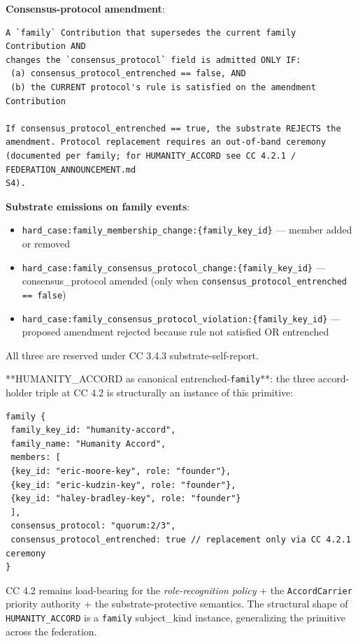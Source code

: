 \documentclass[11pt]{article}
\begin{document}
\textbf{Consensus-protocol amendment}:


\begin{lstlisting}
A `family` Contribution that supersedes the current family Contribution AND
changes the `consensus_protocol` field is admitted ONLY IF:
 (a) consensus_protocol_entrenched == false, AND
 (b) the CURRENT protocol's rule is satisfied on the amendment Contribution

If consensus_protocol_entrenched == true, the substrate REJECTS the
amendment. Protocol replacement requires an out-of-band ceremony
(documented per family; for HUMANITY_ACCORD see CC 4.2.1 / FEDERATION_ANNOUNCEMENT.md
S4).
\end{lstlisting}

\textbf{Substrate emissions on family events}:

\begin{itemize}\setlength\itemsep{0pt}
\item \texttt{hard\_case:family\_membership\_change:\{family\_key\_id\}} — member added or removed
\item \texttt{hard\_case:family\_consensus\_protocol\_change:\{family\_key\_id\}} — consensus\_protocol amended (only when \texttt{consensus\_protocol\_entrenched == false})
\item \texttt{hard\_case:family\_consensus\_protocol\_violation:\{family\_key\_id\}} — proposed amendment rejected because rule not satisfied OR entrenched
\end{itemize}


All three are reserved under CC 3.4.3 substrate-self-report.


**HUMANITY\_ACCORD as canonical entrenched-\texttt{family}**: the three accord-holder triple at CC 4.2 is structurally an instance of this primitive:


\begin{lstlisting}
family {
 family_key_id: "humanity-accord",
 family_name: "Humanity Accord",
 members: [
 {key_id: "eric-moore-key", role: "founder"},
 {key_id: "eric-kudzin-key", role: "founder"},
 {key_id: "haley-bradley-key", role: "founder"}
 ],
 consensus_protocol: "quorum:2/3",
 consensus_protocol_entrenched: true // replacement only via CC 4.2.1 ceremony
}
\end{lstlisting}

CC 4.2 remains load-bearing for the \textit{role-recognition policy} + the \texttt{AccordCarrier} priority authority + the substrate-protective semantics. The structural shape of \texttt{HUMANITY\_ACCORD} is a \texttt{family} subject\_kind instance, generalizing the primitive across the federation.
\end{document}
